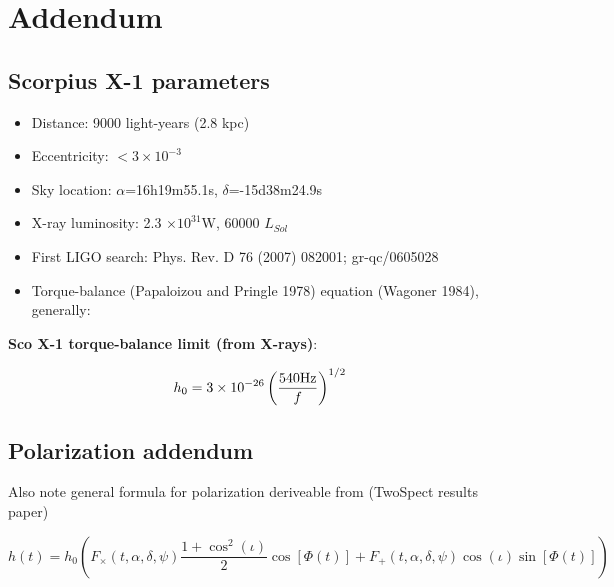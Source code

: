 \section{Addendum}


\subsection{Scorpius X-1 parameters}
\label{scox1_parameters}

\begin{itemize}
\item Distance: 9000 light-years (2.8 kpc)
\item Eccentricity: $<3\times10^{-3}$
\item Sky location: $\alpha$=16h19m55.1s, $\delta$=-15d38m24.9s
\item X-ray luminosity: 2.3 $\times10^{31}$W, 60000 $L_{Sol}$
\item First LIGO search: Phys. Rev. D 76 (2007) 082001; gr-qc/0605028
\item Torque-balance (Papaloizou and Pringle 1978) equation (Wagoner 1984),
generally:
\end{itemize}



\textbf{Sco X-1 torque-balance limit (from X-rays)}:

\begin{equation}
h_{0}=3\times10^{-26}\left(\frac{540\textup{Hz}}{f}\right)^{1/2}
\label{ScoX1_torque_bal}
\end{equation}



\subsection{Polarization addendum}


Also note general formula for polarization deriveable from (TwoSpect
results paper)


\begin{equation}
h(t)=h_{0} \left(F_{\times}(t,\alpha,\delta,\psi)\frac{1+\cos^{2}(\iota)}{2}\cos[\Phi(t)]+
F_{+}(t,\alpha,\delta,\psi)\cos(\iota)\sin[\Phi(t)]\right)
\label{TwoSpect_pol_effect}
\end{equation}



